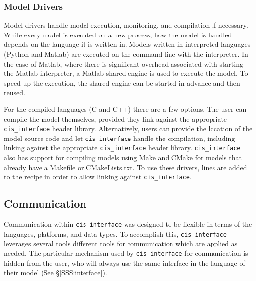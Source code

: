 \documentclass[journal]{IEEEtran}
\newcommand{\cis}{{\tt cis\_interface}{}}
\begin{document}
%

\subsubsection{Model Drivers}\label{SS:model_driver}
%
Model drivers handle model execution, monitoring, and compilation if necessary. 
While every model is executed on a new process, how the model is handled depends 
on the language it is written in. Models written in 
interpreted languages (Python and Matlab) are executed on the command line 
with the interpreter. In the case of Matlab, where there is significant overhead 
associated with starting the Matlab interpreter, a Matlab shared engine is used 
to execute the model. To speed up the execution, the shared engine can be started 
in advance and then reused.

For the compiled languages (C and C++) there are a few options. The user can 
compile the model themselves, provided they link against the appropriate 
{\cis} header library. Alternatively, users can provide the location of 
the model source code and let {\cis} handle the compilation, including 
linking against the appropriate {\cis} header library. {\cis} 
also has support for compiling models using Make \citep{Stallman2004} and 
CMake \citep{Martin2006} for 
models that already have a Makefile or CMakeLists.txt. To use these drivers, 
lines are added to the recipe in order to allow linking against {\cis}.




\subsection{Communication}\label{SS:communication}
%
Communication within {\cis} was designed to be flexible in terms of the 
languages, platforms, and data types. To accomplish this, {\cis} leverages 
several tools different tools for communication which are applied as needed. The 
particular mechanism used by {\cis} for communication is hidden from the 
user, who will always use the same interface in the language of their model 
(See \S\ref{SSS:interface}). 
\end{document}
